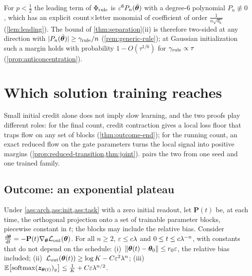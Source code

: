 \begin{remark}
\label{rem:leading-main}
For $p<\frac12$ the leading term of $\Phi_{\mathrm{rule}}$ is $\varepsilon^6P_n(\tilde{\bm\theta})$ with a degree-$6$ polynomial $P_n\not\equiv0$, which
has an explicit count$\times$letter monomial of coefficient of order $\frac{1}{n\sqrt{d_{\mathrm h}}}$ (\cref{lem:leading}). The bound of
\cref{thm:separation}(ii) is therefore two-sided at any direction with $|P_n(\tilde{\bm\theta})|\ge\gamma_{\mathrm{rule}}/n$ (\cref{rem:generic-rule}); at Gaussian
initialization such a margin holds with probability $1-O(\tau^{1/6})$ for $\gamma_{\mathrm{rule}}\propto\tau$ (\cref{prop:anticoncentration}).
\end{remark}

\section{Which solution training reaches}
\label{sec:reach}

Small initial credit alone does not imply slow learning, and the two proofs play different roles: for the final count, credit contraction gives a local loss floor that traps flow on any set of blocks
(\cref{thm:outcome-end}); for the running count, an exact reduced flow on the gate parameters turns the local signal into positive margins
(\cref{prop:reduced-transition,thm:joint}).  pairs the two from one seed and one trained family.

\subsection{Outcome: an exponential plateau}

\begin{theorem}
\label{thm:outcome-end}
Under \cref{ass:arch,ass:init,ass:task} with a zero initial readout, let $\mathbf P(t)$ be, at each time, the orthogonal projection onto a set
of trainable parameter blocks, piecewise constant in $t$; the blocks may include the relative bias. Consider
$\tfrac{d\bm\theta}{dt}=-\mathbf P(t)\nabla_{\bm\theta}\Lout(\bm\theta)$. For all $n\ge2$, $\varepsilon\le c\lambda$ and $0\le t\le c\lambda^{-n}$, with
constants that do not depend on the schedule:
(i)~$\|\bm\theta(t)-\bm\theta_0\|\le r_0\varepsilon$, the relative bias included;
(ii)~$\mathcal L_{\mathrm{out}}(\bm\theta(t))\ge\log K-C\varepsilon^2\lambda^n$;
(iii)~$\mathbb E\bigl[\operatorname{softmax}(\bm z_{\bm\theta(t)})_y\bigr]\le\frac{1}{K}+C\varepsilon\lambda^{n/2}$.
\end{theorem}

